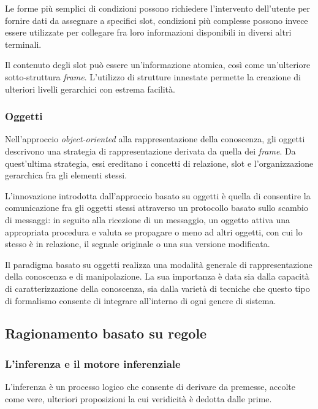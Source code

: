 Le forme più semplici di condizioni possono richiedere l'intervento dell'utente per fornire dati da assegnare a specifici slot, condizioni più complesse possono invece essere utilizzate per collegare fra loro informazioni disponibili in diversi altri terminali. 

Il contenuto degli slot può essere un'informazione atomica, così come un'ulteriore sotto-struttura \emph{frame}. L'utilizzo di strutture innestate permette la creazione di ulteriori livelli gerarchici con estrema facilità. \cite{minsky1974} 

\subsubsection{Oggetti}
Nell'approccio \emph{object-oriented} alla rappresentazione della conoscenza, gli oggetti descrivono una strategia di rappresentazione derivata da quella dei \emph{frame}. Da quest'ultima strategia, essi ereditano i concetti di relazione, slot e l'organizzazione gerarchica fra gli elementi stessi.~\cite{holsapple1994object}

L'innovazione introdotta dall'approccio basato su oggetti è quella di consentire la comunicazione fra gli oggetti stessi attraverso un protocollo basato sullo scambio di messaggi: in seguito alla ricezione di un messaggio, un oggetto attiva una appropriata procedura e valuta se propagare o meno ad altri oggetti, con cui lo stesso è in relazione, il segnale originale o una sua versione modificata.~\cite{development1993}

Il paradigma basato su oggetti realizza una modalità generale di rappresentazione della conoscenza e di manipolazione. La sua importanza è data sia dalla capacità di caratterizzazione della conoscenza, sia dalla varietà di tecniche che questo tipo di formalismo consente di integrare all'interno di ogni genere di sistema.~\cite{holsapple1994object}

\subsection{Ragionamento basato su regole}

\subsubsection{L'inferenza e il motore inferenziale}

L'inferenza è un processo logico che consente di derivare da premesse, accolte come vere, ulteriori proposizioni la cui veridicità è dedotta dalle prime.

